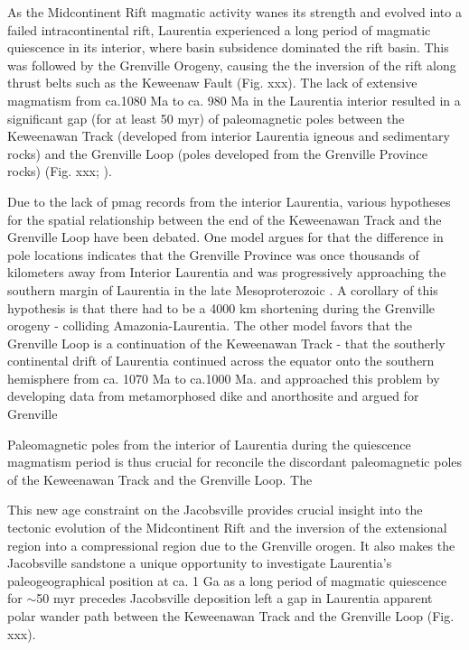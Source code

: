 \documentclass[11pt,letterpaper]{article}
\begin{document}
As the Midcontinent Rift magmatic activity wanes its strength and evolved into a failed intracontinental rift, Laurentia experienced a long period of magmatic quiescence in its interior, where basin subsidence dominated the rift basin. This was followed by the Grenville Orogeny, causing the the inversion of the rift along thrust belts such as the Keweenaw Fault (Fig. xxx). The lack of extensive magmatism from ca.1080 Ma to ca. 980 Ma in the Laurentia interior resulted in a significant gap (for at least 50 myr) of paleomagnetic poles between the Keweenawan Track (developed from interior Laurentia igneous and sedimentary rocks) and the Grenville Loop (poles developed from the Grenville Province rocks) (Fig. xxx; \cite{Swanson-Hysell2019a}).  

Due to the lack of pmag records from the interior Laurentia, various hypotheses for the spatial relationship between the end of the Keweenawan Track and the Grenville Loop have been debated. One model argues for that the difference in pole locations indicates that the Grenville Province was once thousands of kilometers away from Interior Laurentia and was progressively approaching the southern margin of Laurentia in the late Mesoproterozoic \citep{Halls2015}. A corollary of this hypothesis is that there had to be a 4000 km shortening during the Grenville orogeny - colliding Amazonia-Laurentia. The other model favors that the Grenville Loop is a continuation of the Keweenawan Track - that the southerly continental drift of Laurentia continued across the equator onto the southern hemisphere from ca. 1070 Ma to ca.1000 Ma. and  approached this problem by developing data from metamorphosed dike and anorthosite and argued for Grenville  

Paleomagnetic poles from the interior of Laurentia during the quiescence magmatism period is thus crucial for reconcile the discordant paleomagnetic poles of the Keweenawan Track and the Grenville Loop. The

This new age constraint on the Jacobsville provides crucial insight into the tectonic evolution of the Midcontinent Rift and the inversion of the extensional region into a compressional region due to the Grenville orogen. It also makes the Jacobsville sandstone a unique opportunity to investigate Laurentia's paleogeographical position at ca. 1 Ga as a long period of magmatic quiescence for $\sim$50 myr precedes Jacobsville deposition left a gap in Laurentia apparent polar wander path between the Keweenawan Track and the Grenville Loop (Fig. xxx). 
\end{document}
